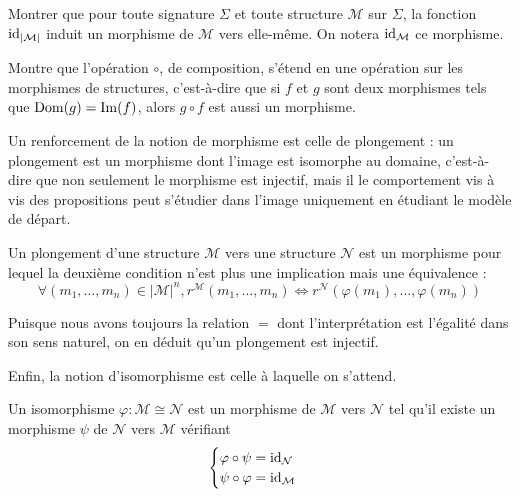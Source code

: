\begin{exercise}
  Montrer que pour toute signature $\Sigma$ et toute structure $\mathcal M$ sur
  $\Sigma$, la fonction $\operatorname{id}_{|\mathcal M|}$ induit un morphisme de $\mathcal M$
  vers elle-même. On notera $\operatorname{id}_\mathcal M$ ce morphisme.
\end{exercise}

\begin{exercise}
  Montre que l'opération $\circ$, de composition, s'étend en une opération sur
  les morphismes de structures, c'est-à-dire que si $f$ et $g$ sont deux
  morphismes tels que $\operatorname{Dom}(g) = \operatorname{Im}(f)$, alors $g\circ f$ est aussi un
  morphisme.
\end{exercise}

Un renforcement de la notion de morphisme est celle de plongement : un plongement
est un morphisme dont l'image est isomorphe au domaine, c'est-à-dire que non
seulement le morphisme est injectif, mais il le comportement vis à vis des
propositions peut s'étudier dans l'image uniquement en étudiant le modèle de
départ.

\begin{definition}[Plongement]
  Un plongement d'une structure $\mathcal M$ vers une structure $\mathcal N$ est
  un morphisme pour lequel la deuxième condition n'est plus une implication mais
  une équivalence :
  \[\forall(m_1,\ldots,m_n)\in|\mathcal M|^n,r^{\mathcal M}(m_1,\ldots,m_n) \iff
  r^{\mathcal N}(\varphi(m_1),\ldots,\varphi(m_n))\]
\end{definition}

\begin{remark}
  Puisque nous avons toujours la relation $=$ dont l'interprétation est l'égalité
  dans son sens naturel, on en déduit qu'un plongement est injectif.
\end{remark}

Enfin, la notion d'isomorphisme est celle à laquelle on s'attend.

\begin{definition}[Isomorphisme]
  Un isomorphisme $\varphi : \mathcal M \cong \mathcal N$ est un morphisme de
  $\mathcal M$ vers $\mathcal N$ tel qu'il existe un morphisme $\psi$ de
  $\mathcal N$ vers $\mathcal M$ vérifiant
  \[\begin{cases}
  \varphi\circ \psi = \operatorname{id}_{\mathcal N}\\
  \psi\circ\varphi = \operatorname{id}_{\mathcal M}
  \end{cases}\]
\end{definition}

